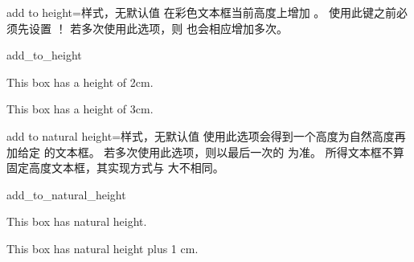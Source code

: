 \clearpage

\begin{docTcbKey}[][doc new=2014-11-07]{add to height}{=}{样式，无默认值}
  在彩色文本框当前高度上增加 。
  使用此键之前必须先设置 ！
  若多次使用此选项，则  也会相应增加多次。
\begin{exdispExample}{add_to_height}

\begin{tcolorbox}
  This box has a height of 2cm.
\end{tcolorbox}
\begin{tcolorbox}[add to height=1cm]
  This box has a height of 3cm.
\end{tcolorbox}
\end{exdispExample}
\end{docTcbKey}


\begin{docTcbKey}[][doc new=2016-02-16]{add to natural height}{=}{样式，无默认值}
  使用此选项会得到一个高度为自然高度再加给定  的文本框。
  若多次使用此选项，则以最后一次的  为准。
  所得文本框不算固定高度文本框，其实现方式与  大不相同。
\begin{exdispExample}{add_to_natural_height}

\begin{tcolorbox}
  This box has natural height.
\end{tcolorbox}
\begin{tcolorbox}[add to natural height=1cm]
  This box has natural height plus 1 cm.
\end{tcolorbox}
\end{exdispExample}
\end{docTcbKey}


